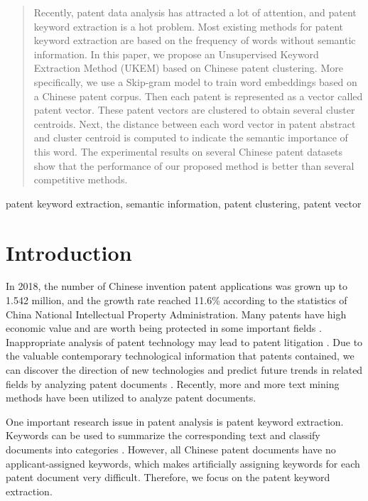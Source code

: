 \documentclass[conference]{IEEEtran}
\begin{document}
	\begin{abstract}
		Recently, patent data analysis has attracted a lot of attention, and patent keyword extraction is a hot problem. Most existing methods for patent keyword extraction are based on the frequency of words without semantic information. In this paper, we propose an Unsupervised Keyword Extraction Method (UKEM) based on Chinese patent clustering. More specifically, we use a Skip-gram model to train word embeddings based on a Chinese patent corpus. Then each patent is represented as a vector called patent vector. These patent vectors are clustered to obtain several cluster centroids. Next, the distance between each word vector in patent abstract and cluster centroid is computed to indicate the semantic importance of this word. The experimental results on several Chinese patent datasets show that the performance of our proposed method is better than several competitive methods.
	\end{abstract}
	
	\begin{IEEEkeywords}
		patent keyword extraction, semantic information, patent clustering, patent vector
	\end{IEEEkeywords}
	
	\section{Introduction}
	In 2018, the number of Chinese invention patent applications was grown up to 1.542 million, and the growth rate reached 11.6\% according to the statistics of China National Intellectual Property Administration. Many patents have high economic value and are worth being protected in some important fields \cite{b1}. Inappropriate analysis of patent technology may lead to patent litigation \cite{b2}. Due to the valuable contemporary technological information that patents contained, we can discover the direction of new technologies and predict future trends in related fields by analyzing patent documents \cite{b3}. Recently, more and more text mining methods have been utilized to analyze patent documents.
	
	One important research issue in patent analysis is patent keyword extraction. Keywords can be used to summarize the corresponding text and classify documents into categories \cite{b4}. However, all Chinese patent documents have no applicant-assigned keywords, which makes artificially assigning keywords for each patent document very difficult. Therefore, we focus on the patent keyword extraction.
	
\end{document}
